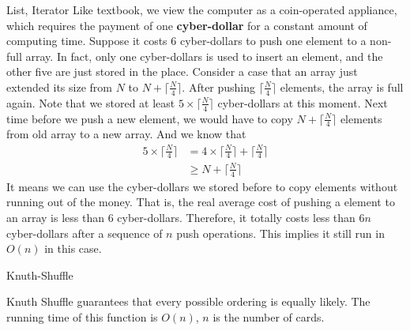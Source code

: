 \pagebreak

\begin{homeworkProblem}{List, Iterator}
    Like textbook, we view the computer as a coin-operated appliance, which requires
    the payment of one \textbf{cyber-dollar} for a constant amount of computing time.
    Suppose it costs 6 cyber-dollars to push one element to a non-full array. In fact,
    only one cyber-dollars is used to insert an element, and the other five are just
    stored in the place. Consider a case that an array just extended its size from 
    $N$ to $N + \lceil \frac{N}{4} \rceil$. After pushing $\lceil \frac{N}{4} \rceil$ elements, 
    the array is full again. Note that we stored at least 
    $5 \times \lceil \frac{N}{4}\rceil$ cyber-dollars at this moment. Next time before
    we push a new element, we would have to copy $N + \lceil \frac{N}{4} \rceil$
    elements from old array to a new array. And we know that
    \[
        \begin{split}
            5 \times \lceil \frac{N}{4}\rceil &= 4 \times \lceil \frac{N}{4}\rceil + \lceil \frac{N}{4}\rceil \\
            &\geq N + \lceil \frac{N}{4}\rceil
        \end{split}
    \]
    It means we can use the cyber-dollars we stored before to copy elements without 
    running out of the money. That is, the real average cost of pushing a element 
    to an array is less than 6 cyber-dollars. Therefore, it totally costs less than $6n$
    cyber-dollars after a sequence of $n$ push operations. This implies it still run in
    $O(n)$ in this case.

    


    \begin{algorithm}[]
        \begin{algorithmic}[1]
            \EndFor
            \EndFunction{}
        \end{algorithmic}
        \caption{Knuth-Shuffle}
    \end{algorithm}

    Knuth Shuffle guarantees that every possible ordering is equally likely. The running time
    of this function is $O(n)$, $n$ is the number of cards.


\end{homeworkProblem}


